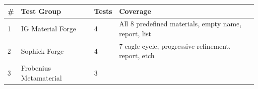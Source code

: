 \documentclass[12pt,a4paper]{article}
\begin{document}
\begin{longtable}[]{@{}llll@{}}
\toprule
\begin{minipage}[b]{0.09\columnwidth}\raggedright
\#\strut
\end{minipage} & \begin{minipage}[b]{0.31\columnwidth}\raggedright
Test Group\strut
\end{minipage} & \begin{minipage}[b]{0.20\columnwidth}\raggedright
Tests\strut
\end{minipage} & \begin{minipage}[b]{0.29\columnwidth}\raggedright
Coverage\strut
\end{minipage}\tabularnewline
\midrule
\endhead
\begin{minipage}[t]{0.09\columnwidth}\raggedright
1\strut
\end{minipage} & \begin{minipage}[t]{0.31\columnwidth}\raggedright
IG Material Forge\strut
\end{minipage} & \begin{minipage}[t]{0.20\columnwidth}\raggedright
4\strut
\end{minipage} & \begin{minipage}[t]{0.29\columnwidth}\raggedright
All 8 predefined materials, empty name, report, list\strut
\end{minipage}\tabularnewline
\begin{minipage}[t]{0.09\columnwidth}\raggedright
2\strut
\end{minipage} & \begin{minipage}[t]{0.31\columnwidth}\raggedright
Sophick Forge\strut
\end{minipage} & \begin{minipage}[t]{0.20\columnwidth}\raggedright
4\strut
\end{minipage} & \begin{minipage}[t]{0.29\columnwidth}\raggedright
7-eagle cycle, progressive refinement, report, etch\strut
\end{minipage}\tabularnewline
\begin{minipage}[t]{0.09\columnwidth}\raggedright
3\strut
\end{minipage} & \begin{minipage}[t]{0.31\columnwidth}\raggedright
Frobenius Metamaterial\strut
\end{minipage} & \begin{minipage}[t]{0.20\columnwidth}\raggedright
3\strut
\end{minipage} & \begin{minipage}[t]{0.29\columnwidth}\raggedright

\end{minipage}
\end{longtable}
\end{document}
